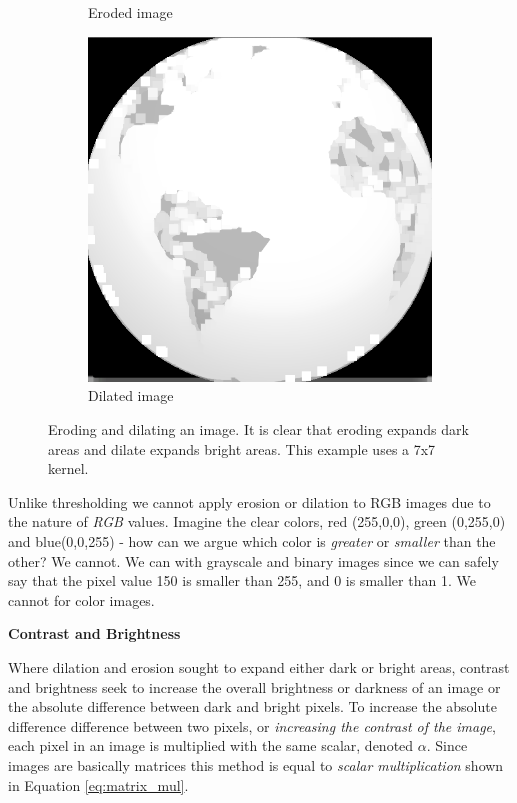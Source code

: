 \begin{figure}[!ht]
\begin{subfigure}[b]{0.3\textwidth}
                \caption{Eroded image}
        \end{subfigure}
		\quad
        \begin{subfigure}[b]{0.3\textwidth}
                \includegraphics[scale = 0.2]{img/dilate}
                \caption{Dilated image}
        \end{subfigure}
		\caption{Eroding and dilating an image. It is clear that eroding expands dark areas and dilate expands bright areas. This example uses a 7x7 kernel.}
		\label{fig:erodedilate}
\end{figure}

Unlike thresholding we cannot apply erosion or dilation to RGB images due to the nature of \textit{RGB} values. Imagine the clear colors, red (255,0,0), green (0,255,0) and blue(0,0,255) - how can we argue which color is \textit{greater} or \textit{smaller} than the other? We cannot. We can with grayscale and binary images since we can safely say that the pixel value 150 is smaller than 255, and 0 is smaller than 1. We cannot for color images.

\newpage

\noindent \textbf{Contrast and Brightness} \par
Where dilation and erosion sought to expand either dark or bright areas, contrast and brightness seek to increase the overall brightness or darkness of an image or the absolute difference between dark and bright pixels. To increase the absolute difference difference between two pixels, or \textit{increasing the contrast of the image}, each pixel in an image is multiplied with the same scalar, denoted $\alpha$. Since images are basically matrices this method is equal to \textit{scalar multiplication} shown in Equation \ref{eq:matrix_mul}.

